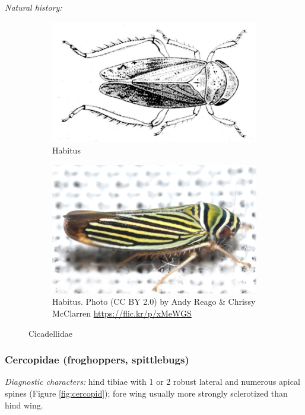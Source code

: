 \documentclass[letterpaper, 11pt]{article}
\begin{document}
\noindent{}\textit{Natural history:} \\

\begin{figure}[ht!]
 \centering
 \begin{subfigure}[ht!]{0.4\textwidth}
  \includegraphics[width=\textwidth]{CicadellidHabitusInk}
  \caption{Habitus \citep[][Plate 8, Fig. 16]{bhl37902}}
  \label{fig:cicadellid1}
 \end{subfigure}
 \qquad
 \begin{subfigure}[ht!]{0.45\textwidth}
  \includegraphics[width=\textwidth]{CicadellidHabitus}
  \caption{Habitus. Photo (CC BY 2.0) by Andy Reago \& Chrissy McClarren \url{https://flic.kr/p/xMeWGS}}
  \label{fig:cicadellid2}
 \end{subfigure}
 \caption{Cicadellidae}\label{fig:cicadellids}
\end{figure}

\subsubsection{Cercopidae (froghoppers, spittlebugs)}
\noindent{}\textit{Diagnostic characters:} hind tibiae with 1 or 2 robust lateral and numerous apical spines (Figure \ref{fig:cercopid}); fore wing usually more strongly sclerotized than hind wing.\\
\end{document}
